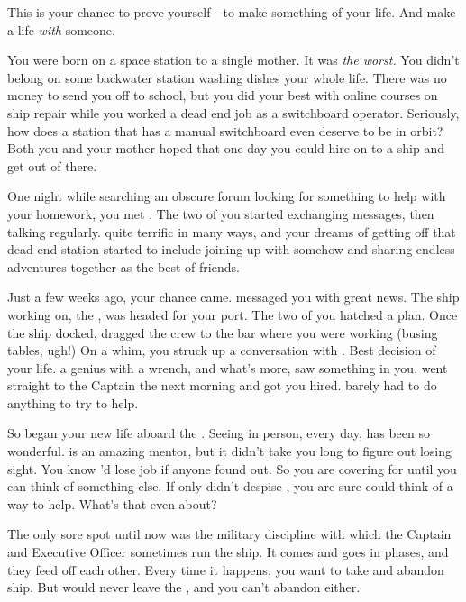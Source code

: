 \documentclass[char]{TMFHope}
\begin{document}
\name{\cBoy{}}

This is your chance to prove yourself - to make something of your life. And make a life \emph{with} someone.

You were born on a space station to a single mother. It was \emph{the worst.} You didn't belong on some backwater station washing dishes your whole life. There was no money to send you off to school, but you did your best with online courses on ship repair while you worked a dead end job as a switchboard operator. Seriously, how does a station that has a manual switchboard even deserve to be in orbit? Both you and your mother hoped that one day you could hire on to a ship and get out of there. 

One night while searching an obscure forum looking for something to help with your homework, you met \cNav{}. The two of you started exchanging messages, then talking regularly. \cNav{\They} \cNav{\are} quite terrific in many ways, and your dreams of getting off that dead-end station started to include joining up with \cNav{} somehow and sharing endless adventures together as the best of friends.

Just a few weeks ago, your chance came. \cNav{} messaged you with great news. The ship \cNav{\they} \cNav{\are} working on, the \pNew{}, was headed for your port. The two of you hatched a plan. Once the ship docked, \cNav{} dragged the crew to the bar where you were working (busing tables, ugh!) On a whim, you struck up a conversation with \cEng{}. Best decision of your life. \cEng{\They} \cEng{\are} a genius with a wrench, and what's more, \cEng{\they} saw something in you. \cEng{\They} went straight to the Captain the next morning and got you hired. \cNav{} barely had to do anything to try to help.

So began your new life aboard the \pNew{}. Seeing \cNav{} in person, every day, has been so wonderful. \cEng{} is an amazing mentor, but it didn't take you long to figure out \cEng{\they} \cEng{\are} losing \cEng{\their} sight. You know \cEng{\they}'d lose \cEng{\their} job if anyone found out. So you are covering for \cEng{} until you can think of something else. If only \cEng{} didn't despise \cNav{}, you are sure \cNav{} could think of a way to help. What's that even about?

The only sore spot until now was the military discipline with which the Captain and Executive Officer sometimes run the ship. It comes and goes in phases, and they feed off each other. Every time it happens, you want to take \cNav{} and abandon ship. But \cEng{} would never leave the \pNew{}, and you can't abandon \cEng{\them} either.
\end{document}
